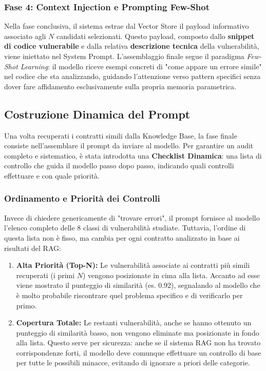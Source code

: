 \subsubsection{Fase 4: Context Injection e Prompting Few-Shot}
Nella fase conclusiva, il sistema estrae dal Vector Store il payload informativo associato agli $N$ candidati selezionati. Questo payload, composto dallo \textbf{snippet di codice vulnerabile} e dalla relativa \textbf{descrizione tecnica} della vulnerabilità, viene iniettato nel System Prompt.
L'assemblaggio finale segue il paradigma \textit{Few-Shot Learning}: il modello riceve esempi concreti di "come appare un errore simile" nel codice che sta analizzando, guidando l'attenzione verso pattern specifici senza dover fare affidamento esclusivamente sulla propria memoria parametrica.

\subsection{Costruzione Dinamica del Prompt}
\label{sec:prompt_engineering}

Una volta recuperati i contratti simili dalla Knowledge Base, la fase finale consiste nell'assemblare il prompt da inviare al modello. Per garantire un audit completo e sistematico, è stata introdotta una \textbf{Checklist Dinamica}: una lista di controllo che guida il modello passo dopo passo, indicando quali controlli effettuare e con quale priorità.

\subsubsection{Ordinamento e Priorità dei Controlli}
Invece di chiedere genericamente di "trovare errori", il prompt fornisce al modello l'elenco completo delle 8 classi di vulnerabilità studiate. Tuttavia, l'ordine di questa lista non è fisso, ma cambia per ogni contratto analizzato in base ai risultati del RAG:

\begin{enumerate}
    \item \textbf{Alta Priorità (Top-N):} Le vulnerabilità associate ai contratti più simili recuperati (i primi $N$) vengono posizionate in cima alla lista. Accanto ad esse viene mostrato il punteggio di similarità (es. 0.92), segnalando al modello che è molto probabile riscontrare quel problema specifico e di verificarlo per primo.
    \item \textbf{Copertura Totale:} Le restanti vulnerabilità, anche se hanno ottenuto un punteggio di similarità basso, non vengono eliminate ma posizionate in fondo alla lista. Questo serve per sicurezza: anche se il sistema RAG non ha trovato corrispondenze forti, il modello deve comunque effettuare un controllo di base per tutte le possibili minacce, evitando di ignorare a priori delle categorie.
\end{enumerate}

